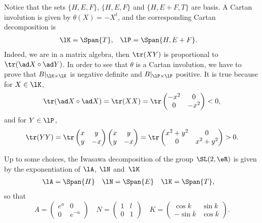 Notice that the sets $\{ H,E,F \}$, $\{ H,E,F \}$ and $\{ H,E+F,T \}$ are basis. A Cartan involution is given by $\theta(X)=-X^t$, and the corresponding Cartan decomposition is
\begin{align}
	\lK & =\Span\{ T \},
	    & \lP            & =\Span\{ H,E+F \}.
\end{align}
Indeed, we are in a matrix algebra, then $\tr(XY)$ is proportional to $\tr(\ad X\circ \ad Y)$.
In order to see that $\theta$ is a Cartan involution, we have to prove that $B|_{\lK\times\lK}$ is negative definite and $B|_{\lP\times\lP}$ positive. It is true because for $X\in\lK$,
\[
	\tr(\ad X\circ \ad X)=\tr(XX)=\tr\begin{pmatrix}
		-x^2 & 0    \\
		0    & -x^2
	\end{pmatrix}<0,
\]
and for $Y\in\lP$,
\[
	\tr(YY)=\tr\begin{pmatrix}
		x & y  \\
		y & -x
	\end{pmatrix}\begin{pmatrix}
		x & y  \\
		y & -x
	\end{pmatrix} =\tr\begin{pmatrix}
		x^2+y^2 & 0       \\
		0       & x^2+y^2
	\end{pmatrix} >0.
\]

Up to some choices, the Iwasawa decomposition\label{pg_iwasldr} of the group $\SL(2,\eR)$ is given by the exponentiation of $\lA$, $\lN$ and~$\lK$
\begin{equation}
	\begin{aligned}
		\lA & =\Span\{ H \}
		    & \lN           & =\Span\{ E \}
		    & \lK           & =\Span\{T\},
	\end{aligned}
\end{equation}
so that
\begin{equation}\label{eq:expo_ANK}
	A=\begin{pmatrix}
		e^a & 0      \\
		0   & e^{-a}
	\end{pmatrix}\quad
	N=\begin{pmatrix}
		1 & l \\
		0 & 1
	\end{pmatrix}\quad
	K=\begin{pmatrix}
		\cos k  & \sin k \\
		-\sin k & \cos k
	\end{pmatrix}.
\end{equation}

